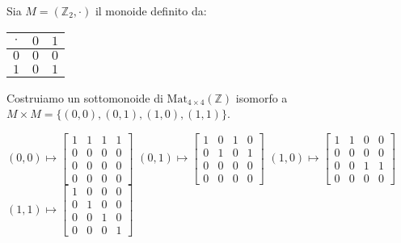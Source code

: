 \documentclass[../main.tex]{subfiles}
\begin{document}
\begin{example}
    Sia $M = (\mathbb{Z}_2, \cdot)$ il monoide definito da:
    \vspace*{0.5em}
    \begin{center}
        \begin{tabular}{c|c|c}
            $\cdot$ & $0$ & $1$ \\
            \hline
            $0$     & $0$ & $0$ \\
            \hline
            $1$     & $0$ & $1$ \\
        \end{tabular}
    \end{center}
    \vspace*{0.5em}
    Costruiamo un sottomonoide di $\text{Mat}_{4 \times 4}(\mathbb{Z})$ isomorfo a $M \times M = \{(0,0), (0,1), (1,0), (1,1)\}$.
    \vspace*{1em}
    \begin{center}
        $(0,0) \mapsto
            \begin{bmatrix}
                1 & 1 & 1 & 1 \\
                0 & 0 & 0 & 0 \\
                0 & 0 & 0 & 0 \\
                0 & 0 & 0 & 0
            \end{bmatrix}$
        $(0,1) \mapsto \begin{bmatrix}
                1 & 0 & 1 & 0 \\
                0 & 1 & 0 & 1 \\
                0 & 0 & 0 & 0 \\
                0 & 0 & 0 & 0
            \end{bmatrix}$
        $(1,0) \mapsto \begin{bmatrix}
                1 & 1 & 0 & 0 \\
                0 & 0 & 0 & 0 \\
                0 & 0 & 1 & 1 \\
                0 & 0 & 0 & 0
            \end{bmatrix}$
        $(1,1) \mapsto \begin{bmatrix}
                1 & 0 & 0 & 0 \\
                0 & 1 & 0 & 0 \\
                0 & 0 & 1 & 0 \\
                0 & 0 & 0 & 1
            \end{bmatrix}$
    \end{center}

\end{example}
\end{document}
